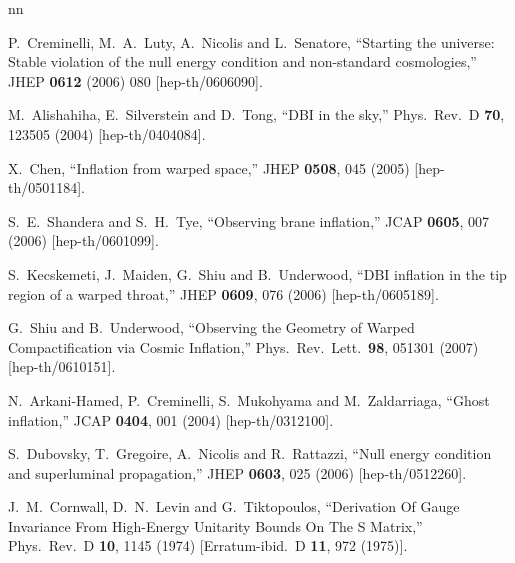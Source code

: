 \documentclass[12pt,letterpaper]{article}
\begin{document}
{\begin{thebibliography}{nn}

%
  P.~Creminelli, M.~A.~Luty, A.~Nicolis and L.~Senatore,
  ``Starting the universe: Stable violation of the null energy condition and
  non-standard cosmologies,''
  JHEP {\bf 0612} (2006) 080
  [hep-th/0606090].

  M.~Alishahiha, E.~Silverstein and D.~Tong,
  ``DBI in the sky,''
  Phys.\ Rev.\ D {\bf 70}, 123505 (2004)
  [hep-th/0404084].

  X.~Chen,
  ``Inflation from warped space,''
  JHEP {\bf 0508}, 045 (2005)
  [hep-th/0501184].

  S.~E.~Shandera and S.~H.~Tye,
  ``Observing brane inflation,''
  JCAP {\bf 0605}, 007 (2006)
  [hep-th/0601099].

  S.~Kecskemeti, J.~Maiden, G.~Shiu and B.~Underwood,
  ``DBI inflation in the tip region of a warped throat,''
  JHEP {\bf 0609}, 076 (2006)
  [hep-th/0605189].

  G.~Shiu and B.~Underwood,
  ``Observing the Geometry of Warped Compactification via Cosmic Inflation,''
  Phys.\ Rev.\ Lett.\  {\bf 98}, 051301 (2007)
  [hep-th/0610151].

  N.~Arkani-Hamed, P.~Creminelli, S.~Mukohyama and M.~Zaldarriaga,
  ``Ghost inflation,''
  JCAP {\bf 0404}, 001 (2004)
  [hep-th/0312100].

  S.~Dubovsky, T.~Gregoire, A.~Nicolis and R.~Rattazzi,
  ``Null energy condition and superluminal propagation,''
  JHEP {\bf 0603}, 025 (2006)
  [hep-th/0512260].

  J.~M.~Cornwall, D.~N.~Levin and G.~Tiktopoulos,
  ``Derivation Of Gauge Invariance From High-Energy Unitarity Bounds On The S
  Matrix,''
  Phys.\ Rev.\  D {\bf 10}, 1145 (1974)
  [Erratum-ibid.\  D {\bf 11}, 972 (1975)].


\end{thebibliography}}
\end{document}
